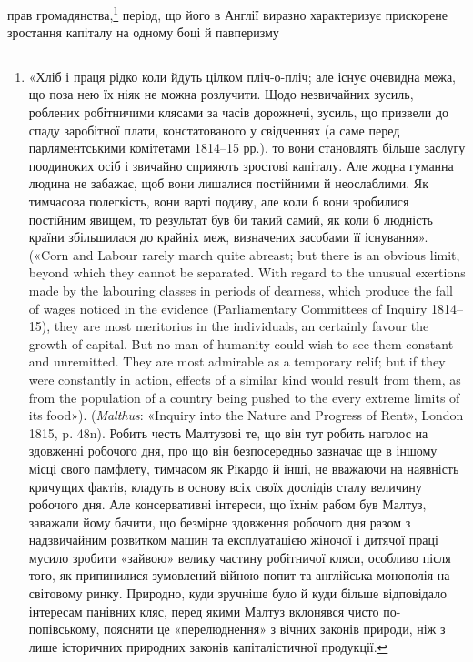 прав громадянства,\footnote{
«Хліб і праця рідко коли йдуть цілком пліч-о-пліч; але існує
очевидна межа, що поза нею їх ніяк не можна розлучити. Щодо незвичайних
зусиль, роблених робітничими клясами за часів дорожнечі, зусиль,
що призвели до спаду заробітної плати, констатованого у свідченнях
(а саме перед парляментськими комітетами 1814--15 рр.), то вони
становлять більше заслугу поодиноких осіб і звичайно сприяють зростові
капіталу. Але жодна гуманна людина не забажає, щоб вони лишалися
постійними й неослаблими. Як тимчасова полегкість, вони варті
подиву, але коли б вони зробилися постійним явищем, то результат був
би такий самий, як коли б людність країни збільшилася до крайніх меж,
визначених засобами її існування». («Corn and Labour rarely march
quite abreast; but there is an obvious limit, beyond which they cannot
be separated. With regard to the unusual exertions made by the labouring
classes in periods of dearness, which produce the fall of wages noticed in
the evidence (Parliamentary Committees of Inquiry 1814--15), they are
most meritorius in the individuals, an certainly favour the growth of capital.
But no man of humanity could wish to see them constant and unremitted.
They are most admirable as a temporary relif; but if they were
constantly in action, effects of a similar kind would result from them, as
from the population of a country being pushed to the every extreme limits
of its food»). (\emph{Malthus}: «Inquiry into the Nature and Progress of Rent»,
London 1815, p. 48n). Робить честь Малтузові те, що він тут робить
наголос на здовженні робочого дня, про що він безпосередньо зазначає
ще в іншому місці свого памфлету, тимчасом як Рікардо й інші, не вважаючи
на наявність кричущих фактів, кладуть в основу всіх своїх дослідів
сталу величину робочого дня. Але консервативні інтереси, що їхнім
рабом був Малтуз, заважали йому бачити, що безмірне здовження робочого
дня разом з надзвичайним розвитком машин та експлуатацією жіночої
і дитячої праці мусило зробити «зайвою» велику частину робітничої
кляси, особливо після того, як припинилися зумовлений війною попит
та англійська монополія на світовому ринку. Природно, куди зручніше
було й куди більше відповідало інтересам панівних кляс, перед якими
Малтуз вклонявся чисто по-попівському, поясняти це «перелюднення»
з вічних законів природи, ніж з лише історичних природних законів
капіталістичної продукції.
} період, що його в Англії виразно характеризує
прискорене зростання капіталу на одному боці й павперизму
